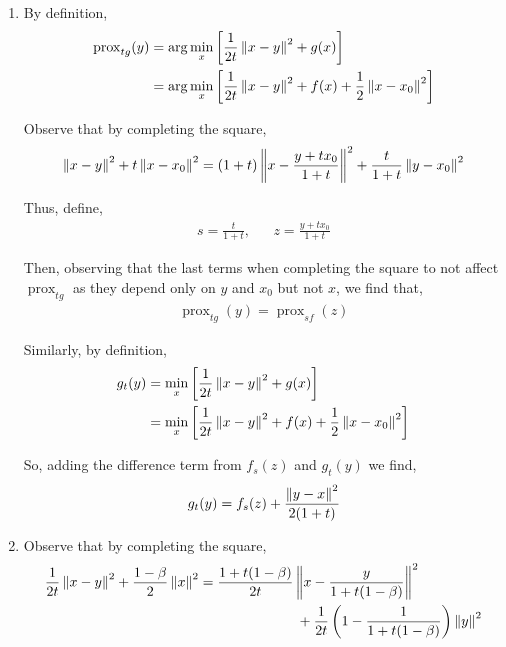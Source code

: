 \documentclass[10pt]{article}
\newcommand{\prox}{\operatorname{prox}}
\begin{document}
\begin{solution}[Solution]
\begin{enumerate}[label=(\alph*)]
    \item     
        By definition,
        \begin{align*}
            \prox_{tg}(y) 
            &= \arg\min_x \left[ \frac{1}{2t} \norm{x-y}^2 + g(x) \right]
            \\&= \arg\min_x \left[ \frac{1}{2t} \norm{x-y}^2 + f(x) + \frac{1}{2}\norm{x-x_0}^2 \right]
        \end{align*}
        
        Observe that by completing the square,
        \begin{align*}
            \left\lVert x-y\right\rVert^2 + t\left\lVert x-x_0\right\rVert^2
            = (1+t) \left\lVert x - \frac{y+tx_0}{1+t}\right\rVert^2 
            + \frac{t}{1+t} \left\lVert y-x_0\right\rVert^2
        \end{align*}
        
        Thus, define,
        \begin{align*}
            s = \frac{t}{1+t}
            ,&&
            z = \frac{y+t x_0}{1+t}
        \end{align*}

        Then, observing that the last terms when completing the square to not affect \( \prox_{tg} \) as they depend only on \( y \) and \( x_0 \) but not \( x \), we find that,
        \begin{align*}
            \prox_{tg}(y) = \prox_{sf}(z)
        \end{align*}

        Similarly, by definition,
        \begin{align*}
            g_t(y) 
            &= \min_x \left[ \frac{1}{2t} \left\lVert x-y\right\rVert^2 + g(x) \right]
            \\&= \min_x \left[ \frac{1}{2t} \left\lVert x-y\right\rVert^2 + f(x) + \frac{1}{2}\left\lVert x-x_0\right\rVert^2 \right]
        \end{align*}

        So, adding the difference term from \( f_s(z) \) and \( g_t(y) \) we find,
        \begin{align*}
            g_t(y) = f_s(z) + \frac{\left\lVert y-x\right\rVert^2}{2(1+t)}
        \end{align*}
        
    

    \item 
        Observe that by completing the square,
        \begin{align*}
            \frac{1}{2t} \left\lVert x-y\right\rVert^2 + \frac{1-\beta}{2} \left\lVert x\right\rVert^2
            &= \frac{1 + t(1-\beta)}{2t} \left\lVert x- \frac{y}{1+t(1-\beta)}\right\rVert^2
            \\& \hspace{7em} + \frac{1}{2t}\left(1 - \frac{1}{1+t(1-\beta)} \right) \left\lVert y\right\rVert^2
        \end{align*}


\end{enumerate}
\end{solution}
\end{document}
